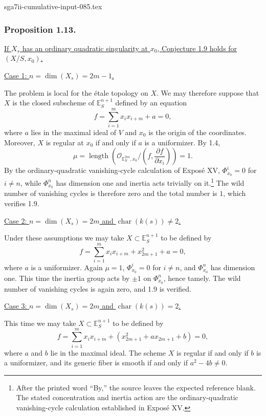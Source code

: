 \begin{filecontents*}{sga7ii-cumulative-input-085.tex}
\subsubsection*{Proposition 1.13.}
\underline{If $X_s$ has an ordinary quadratic singularity at $x_0$,
Conjecture 1.9 holds for $(X/S,x_0)$.}

\medskip
\noindent\underline{Case 1: $n=\dim(X_s)=2m-1$.}

The problem is local for the \'etale topology on $X$.  We may
therefore suppose that $X$ is the closed subscheme of
$\mathbb E_S^{n+1}$ defined by an equation
\[
f=\sum_{i=1}^{m}x_i x_{i+m}+a=0,
\]
where $a$ lies in the maximal ideal of $V$ and $x_0$ is the origin
of the coordinates.  Moreover, $X$ is regular at $x_0$ if and only
if $a$ is a uniformizer.  By 1.4,
\[
\mu=\operatorname{length}\!\left(
\mathcal O_{\mathbb E_S^{2m},x_0}/
\left(f,\frac{\partial f}{\partial x_i}\right)\right)=1.
\]
By the ordinary-quadratic vanishing-cycle calculation of Expos\'e XV,
$\Phi^i_{x_0}=0$ for $i\ne n$, while $\Phi^n_{x_0}$ has dimension
one and inertia acts trivially on it.\footnote{After the printed word
``By,'' the source leaves the expected reference blank.  The stated
concentration and inertia action are the ordinary-quadratic
vanishing-cycle calculation established in Expos\'e XV.}
The wild number of vanishing cycles is therefore zero and the total
number is $1$, which verifies 1.9.

\medskip
\noindent\underline{Case 2: $n=\dim(X_s)=2m$ and
$\operatorname{char}(k(s))\ne2$.}

Under these assumptions we may take $X\subset\mathbb E_S^{n+1}$ to
be defined by
\[
f=\sum_{i=1}^{m}x_i x_{i+m}+x_{2m+1}^2+a=0,
\]
where $a$ is a uniformizer.  Again $\mu=1$,
$\Phi^i_{x_0}=0$ for $i\ne n$, and $\Phi^n_{x_0}$ has dimension
one.  This time the inertia group acts by $\pm1$ on
$\Phi^n_{x_0}$, hence tamely.  The wild number of vanishing cycles is
again zero, and 1.9 is verified.

\medskip
\noindent\underline{Case 3: $n=\dim(X_s)=2m$ and
$\operatorname{char}(k(s))=2$.}

This time we may take $X\subset\mathbb E_S^{n+1}$ to be defined by
\[
f=\sum_{i=1}^{m}x_i x_{i+m}
 +(x_{2m+1}^2+a x_{2m+1}+b)=0,
\]
where $a$ and $b$ lie in the maximal ideal.  The scheme $X$ is
regular if and only if $b$ is a uniformizer, and its generic fiber
is smooth if and only if $a^2-4b\ne0$.


\end{filecontents*}
